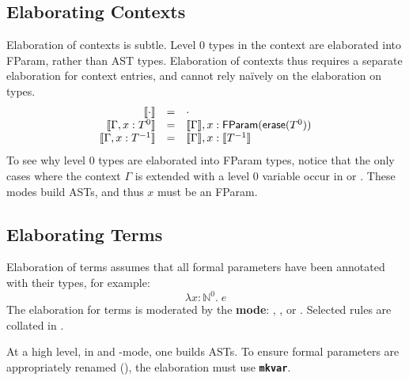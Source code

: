 \subsection{Elaborating Contexts}
Elaboration of contexts is subtle. Level $0$ types in the context are elaborated into \textsf{FParam}, rather than \textsf{AST} types. Elaboration of contexts thus requires a separate elaboration for context entries, and cannot rely naïvely on the elaboration on types.
\[
\begin{array}{rcl}
  \llbracket \cdot \rrbracket & = & \cdot \\
  \llbracket \Gamma, x:T^0 \rrbracket & = & \llbracket \Gamma \rrbracket, x: \textsf{FParam}(\textsf{erase}(T^0))\\
  \llbracket \Gamma, x:T^{-1} \rrbracket & = & \llbracket \Gamma \rrbracket, x: \llbracket T^{-1} \rrbracket
\end{array}
\]
To see why level $0$ types are elaborated into \textsf{FParam} types, notice that the only cases where the context $\Gamma$ is extended with a level $0$ variable occur in \compilemode{} or \quotemode{}. These modes build ASTs, and thus $x$ must be an \textsf{FParam}. 

\subsection{Elaborating Terms}
Elaboration of terms assumes that all formal parameters have been annotated with their types, for example: 
\[\lambda x: \mathbb{N}^0. \; e\]
The elaboration for terms is moderated by the \textbf{mode}: \compilemode{}, \quotemode{}, or \splicemode{}. Selected rules are collated in . 

At a high level, in \compilemode{} and \quotemode{}-mode, one builds ASTs. To ensure formal parameters are appropriately renamed (), the elaboration must use \textbf{\texttt{mkvar}}. 

